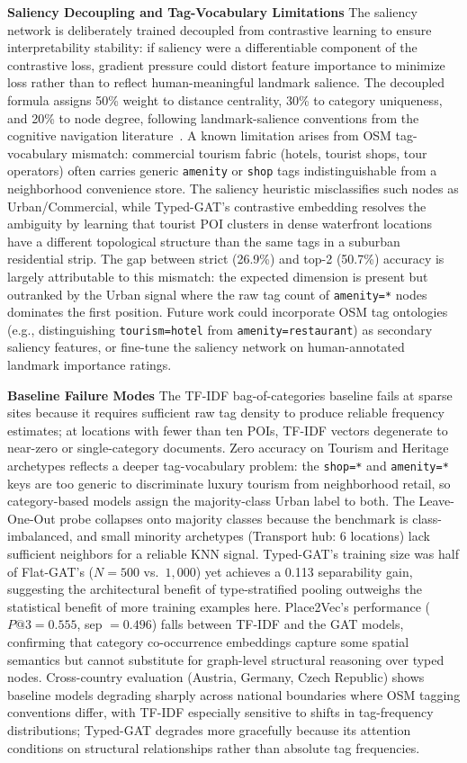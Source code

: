 \documentclass[]{interact}
\theoremstyle{plain}%
\theoremstyle{definition}
\theoremstyle{remark}
\begin{document}
\textbf{Saliency Decoupling and Tag-Vocabulary Limitations} The saliency network is deliberately trained decoupled from contrastive learning to ensure interpretability stability: if saliency were a differentiable component of the contrastive loss, gradient pressure could distort feature importance to minimize loss rather than to reflect human-meaningful landmark salience. The decoupled formula assigns 50\% weight to distance centrality, 30\% to category uniqueness, and 20\% to node degree, following landmark-salience conventions from the cognitive navigation literature~\citep{Caduff, 10.1007/3-540-45799-2_17}. A known limitation arises from OSM tag-vocabulary mismatch: commercial tourism fabric (hotels, tourist shops, tour operators) often carries generic \texttt{amenity} or \texttt{shop} tags indistinguishable from a neighborhood convenience store. The saliency heuristic misclassifies such nodes as Urban/Commercial, while Typed-GAT's contrastive embedding resolves the ambiguity by learning that tourist POI clusters in dense waterfront locations have a different topological structure than the same tags in a suburban residential strip. The gap between strict (26.9\%) and top-2 (50.7\%) accuracy is largely attributable to this mismatch: the expected dimension is present but outranked by the Urban signal where the raw tag count of \texttt{amenity=*} nodes dominates the first position. Future work could incorporate OSM tag ontologies (e.g., distinguishing \texttt{tourism=hotel} from \texttt{amenity=restaurant}) as secondary saliency features, or fine-tune the saliency network on human-annotated landmark importance ratings.

\textbf{Baseline Failure Modes} The TF-IDF bag-of-categories baseline fails at sparse sites because it requires sufficient raw tag density to produce reliable frequency estimates; at locations with fewer than ten POIs, TF-IDF vectors degenerate to near-zero or single-category documents. Zero accuracy on Tourism and Heritage archetypes reflects a deeper tag-vocabulary problem: the \texttt{shop=*} and \texttt{amenity=*} keys are too generic to discriminate luxury tourism from neighborhood retail, so category-based models assign the majority-class Urban label to both. The Leave-One-Out probe collapses onto majority classes because the benchmark is class-imbalanced, and small minority archetypes (Transport hub: 6 locations) lack sufficient neighbors for a reliable KNN signal. Typed-GAT's training size was half of Flat-GAT's ($N=500$ vs.\ $1{,}000$) yet achieves a 0.113 separability gain, suggesting the architectural benefit of type-stratified pooling outweighs the statistical benefit of more training examples here. Place2Vec's performance ($P@3 = 0.555$, sep $= 0.496$) falls between TF-IDF and the GAT models, confirming that category co-occurrence embeddings capture some spatial semantics but cannot substitute for graph-level structural reasoning over typed nodes. Cross-country evaluation (Austria, Germany, Czech Republic) shows baseline models degrading sharply across national boundaries where OSM tagging conventions differ, with TF-IDF especially sensitive to shifts in tag-frequency distributions; Typed-GAT degrades more gracefully because its attention conditions on structural relationships rather than absolute tag frequencies.
\end{document}
